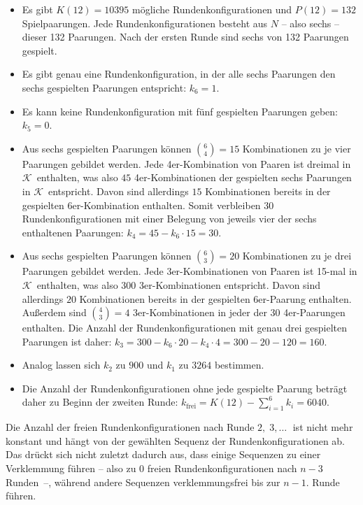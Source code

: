 \documentclass[DIV=15, 10pt]{scrartcl}
\newcommand{\KSet}{$\mathcal{K}$}
\begin{document}
\begin{itemize}

\item Es gibt $K(12) = 10395$ mögliche Rundenkonfigurationen und $P(12) = 132$ Spielpaarungen. Jede Rundenkonfigurationen besteht aus $N$ -- also sechs -- dieser 132 Paarungen. Nach der ersten Runde sind sechs von 132 Paarungen gespielt.

\item Es gibt genau eine Rundenkonfiguration, in der alle sechs Paarungen den sechs gespielten Paarungen entspricht: $k_6 = 1$.

\item Es kann keine Rundenkonfiguration mit fünf gespielten Paarungen geben: $k_5 = 0$.

\item Aus sechs gespielten Paarungen können ${6\choose4} = 15$ Kombinationen zu je vier Paarungen gebildet werden. Jede 4er-Kombination von Paaren ist dreimal in \KSet\ enthalten, was also $45$ 4er-Kombinationen der gespielten sechs Paarungen in \KSet\ entspricht. Davon sind allerdings $15$ Kombinationen bereits in der gespielten 6er-Kombination enthalten. Somit verbleiben $30$ Rundenkonfigurationen mit einer Belegung von jeweils vier der sechs enthaltenen Paarungen: $k_4 = 45 - k_6 \cdot 15 = 30$.

\item Aus sechs gespielten Paarungen können ${6\choose3} = 20$ Kombinationen zu je drei Paarungen gebildet werden. Jede 3er-Kombinationen von Paaren ist 15-mal in \KSet\ enthalten, was also 300 3er-Kombinationen entspricht. Davon sind allerdings $20$ Kombinationen bereits in der gespielten 6er-Paarung enthalten. Außerdem sind ${4\choose3} = 4$ 3er-Kombinationen in jeder der $30$ 4er-Paarungen enthalten. Die Anzahl der Rundenkonfigurationen mit genau drei gespielten Paarungen ist daher: $k_3 = 300 - k_6\cdot20 - k_4 \cdot 4 = 300 - 20 - 120 = 160$.

\item Analog lassen sich $k_2$ zu $900$ und $k_1$ zu $3264$ bestimmen.

\item Die Anzahl der Rundenkonfigurationen ohne jede gespielte Paarung beträgt daher zu Beginn der zweiten Runde: $k_{\text{frei}} = K(12) - \sum_{i=1}^6{k_i} = 6040$.

\end{itemize}

Die Anzahl der freien Rundenkonfigurationen nach Runde $2, \; 3, \ldots \;$ ist nicht mehr konstant und hängt von der gewählten Sequenz der Rundenkonfigurationen ab. Das drückt sich nicht zuletzt dadurch aus, dass einige Sequenzen zu einer Verklemmung führen -- also zu $0$ freien Rundenkonfigurationen nach $n-3$ Runden~--, während andere Sequenzen verklemmungsfrei bis zur $n-1$. Runde führen.
\end{document}
